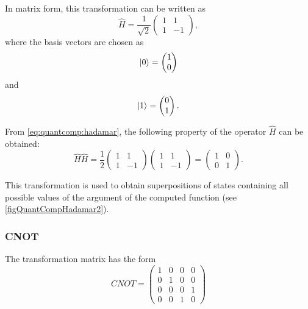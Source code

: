 In matrix form, this transformation can be written as
\begin{equation}
\hat{H} = \frac{1}{\sqrt{2}}
\begin{pmatrix}
1 & 1 \\
1 & -1
\end{pmatrix},
\label{eq:quantcomp:hadamar}
\end{equation}
where the basis vectors are chosen as
\[
\ket{0} = \begin{pmatrix}
1 \\ 0 
\end{pmatrix}
\]
and
\[
\ket{1} = \begin{pmatrix}
0 \\ 1 
\end{pmatrix}.
\]



From \eqref{eq:quantcomp:hadamar}, the following property of the operator $\hat{H}$ can be obtained:
\begin{equation}
\hat{H} \hat{H} = \frac{1}{2}
\begin{pmatrix}
1 & 1 \\
1 & -1
\end{pmatrix}
\begin{pmatrix}
1 & 1 \\
1 & -1
\end{pmatrix} = 
\begin{pmatrix}
1 & 0 \\
0 & 1
\end{pmatrix}.
\label{eq:quantcomp:hadamar_prop}
\end{equation}

This transformation is used to obtain superpositions of states containing all possible values of the argument of the computed function (see \autoref{figQuantCompHadamar2}).



\subsubsection{CNOT}

The transformation matrix has the form
\[
CNOT=\begin{pmatrix}
1 & 0 & 0 & 0 \\
0 & 1 & 0 & 0 \\
0 & 0 & 0 & 1 \\
0 & 0 & 1 & 0 
\end{pmatrix}
\]

